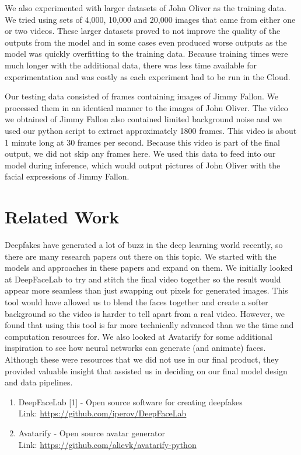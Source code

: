 \documentclass{article}
\begin{document}
We also experimented with larger datasets of John Oliver as the training data. We tried using sets of 4,000, 10,000 and 20,000 images that came from either one or two videos. These larger datasets proved to not improve the quality of the outputs from the model and in some cases even produced worse outputs as the model was quickly overfitting to the training data. Because training times were much longer with the additional data, there was less time available for experimentation and was costly as each experiment had to be run in the Cloud. 

Our testing data consisted of frames containing images of Jimmy Fallon. We processed them in an identical manner to the images of John Oliver. The video we obtained of Jimmy Fallon also contained limited background noise and we used our python script to extract approximately 1800 frames. This video is about 1 minute long at 30 frames per second. Because this video is part of the final output, we did not skip any frames here. We used this data to feed into our model during inference, which would output pictures of John Oliver with the facial expressions of Jimmy Fallon.

\section{Related Work}
Deepfakes have generated a lot of buzz in the deep learning world recently, so there are many research papers out there on this topic. We started with the models and approaches in these papers and expand on them. We initially looked at DeepFaceLab to try and stitch the final video together so the result would appear more seamless than just swapping out pixels for generated images. This tool would have allowed us to blend the faces together and create a softer background so the video is harder to tell apart from a real video. However, we found that using this tool is far more technically advanced than we the time and computation resources for. We also looked at Avatarify for some additional inspiration to see how neural networks can generate (and animate) faces. Although these were resources that we did not use in our final product, they provided valuable insight that assisted us in deciding on our final model design and data pipelines. 

    \begin{enumerate}
        \item DeepFaceLab [1] - Open source software for creating deepfakes \\
        Link: \url{https://github.com/iperov/DeepFaceLab}
        \item Avatarify - Open source avatar generator \\
                Link: \url{https://github.com/alievk/avatarify-python}

    \end{enumerate}
\end{document}

